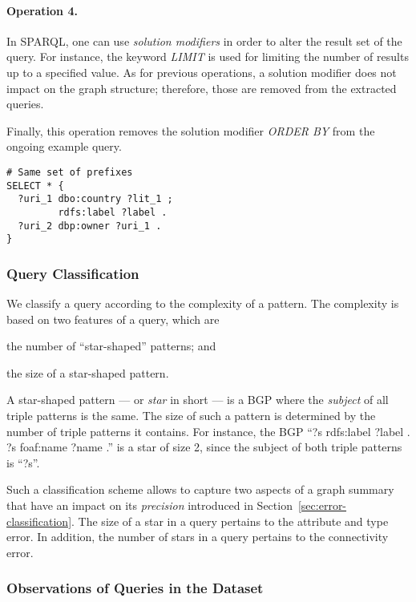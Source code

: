 \paragraph{Operation 4.}

In SPARQL, one can use \emph{solution modifiers} in order to alter the result set of the query. For instance, the keyword \emph{LIMIT} is used for limiting the number of results up to a specified value. As for previous operations, a solution modifier does not impact on the graph structure; therefore, those are removed from the extracted queries.

Finally, this operation removes the solution modifier \emph{ORDER BY} from the ongoing example query.
\begin{verbatim}
# Same set of prefixes
SELECT * {
  ?uri_1 dbo:country ?lit_1 ;
         rdfs:label ?label .
  ?uri_2 dbp:owner ?uri_1 .
}
\end{verbatim}

\subsubsection{Query Classification}

We classify a query according to the complexity of a pattern. The complexity is based on two features of a query, which are
\begin{inparaenum}[(i)]
	\item the number of ``star-shaped'' patterns; and
	\item the size of a star-shaped pattern.
\end{inparaenum}

A star-shaped pattern --- or \emph{star} in short --- is a BGP where the \emph{subject} of all triple patterns is the same. The size of such a pattern is determined by the number of triple patterns it contains. For instance, the BGP ``?s rdfs:label ?label . ?s foaf:name ?name .'' is a star of size 2, since the subject of both triple patterns is ``?s''.

Such a classification scheme allows to capture two aspects of a graph summary that have an impact on its \emph{precision} introduced in Section~\ref{sec:error-classification}. The size of a star in a query pertains to the attribute and type error. In addition, the number of stars in a query pertains to the connectivity error.

\subsubsection{Observations of Queries in the Dataset}


